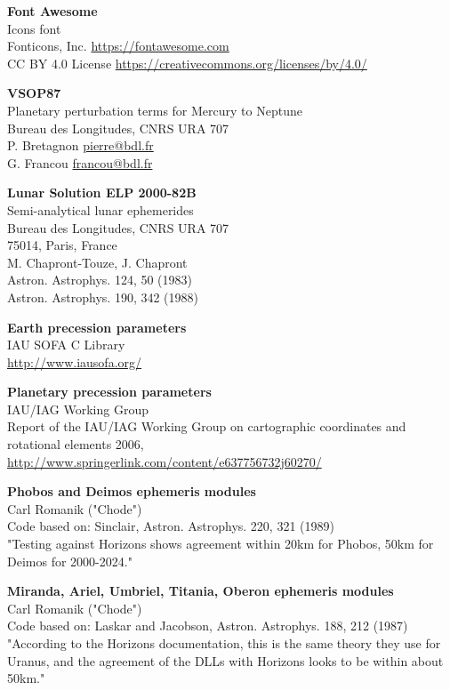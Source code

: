 \documentclass[Orbiter User Manual.tex]{subfiles}
\begin{document}
\textbf{Font Awesome}\\
Icons font\\
Fonticons, Inc. \url{https://fontawesome.com}\\
CC BY 4.0 License \url{https://creativecommons.org/licenses/by/4.0/}

\textbf{VSOP87}\\
Planetary perturbation terms for Mercury to Neptune\\
Bureau des Longitudes, CNRS URA 707\\
P. Bretagnon \href{mailto:pierre@bdl.fr}{pierre@bdl.fr}\\
G. Francou \href{mailto:francou@bdl.fr}{francou@bdl.fr}

\textbf{Lunar Solution ELP 2000-82B}\\
Semi-analytical lunar ephemerides\\
Bureau des Longitudes, CNRS URA 707\\
75014, Paris, France\\
M. Chapront-Touze, J. Chapront\\
Astron. Astrophys. 124, 50 (1983)\\
Astron. Astrophys. 190, 342 (1988)

\textbf{Earth precession parameters}\\
IAU SOFA C Library\\
\url{http://www.iausofa.org/}

\textbf{Planetary precession parameters}\\
IAU/IAG Working Group\\
Report of the IAU/IAG Working Group on cartographic coordinates and rotational
elements 2006, \url{http://www.springerlink.com/content/e637756732j60270/}

\textbf{Phobos and Deimos ephemeris modules}\\
Carl Romanik ("Chode")\\
Code based on: Sinclair, Astron. Astrophys. 220, 321 (1989)\\
"Testing against Horizons shows agreement within 20km for Phobos, 50km for
Deimos for 2000-2024."

\textbf{Miranda, Ariel, Umbriel, Titania, Oberon ephemeris modules}\\
Carl Romanik ("Chode")\\
Code based on: Laskar and Jacobson, Astron. Astrophys. 188, 212 (1987)\\
"According to the Horizons documentation, this is the same theory they use for
Uranus, and the agreement of the DLLs with Horizons looks to be within about
50km."
\end{document}
